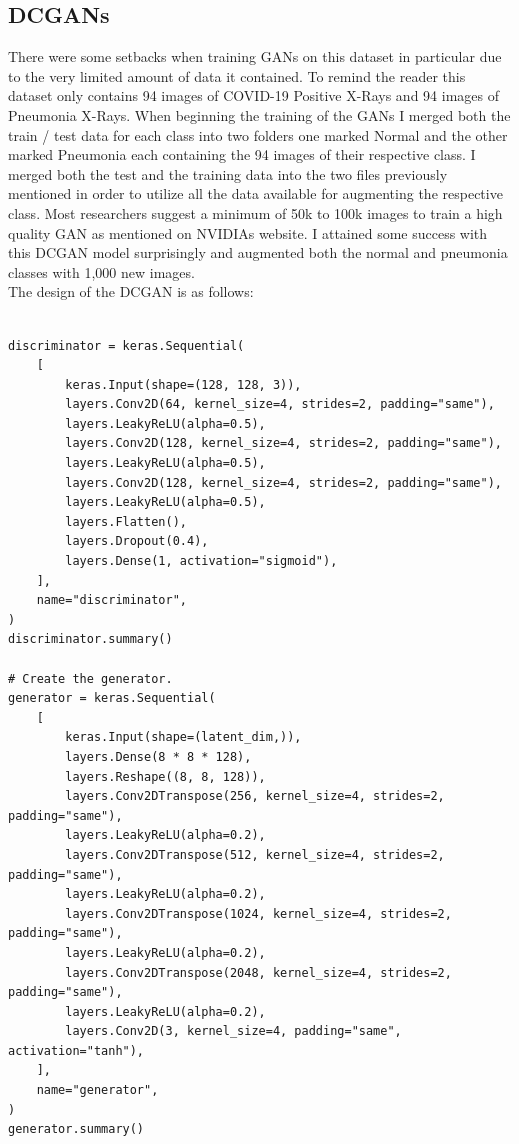 \subsection{DCGANs}
There were some setbacks when training GANs on this dataset in particular due to the very limited amount of data it contained.  To remind the reader this dataset only contains 94 images of COVID-19 Positive X-Rays and 94 images of Pneumonia X-Rays.  When beginning the training of the GANs I merged both the train / test data for each class into two folders one marked Normal and the other marked Pneumonia each containing the 94 images of their respective class.  I merged both the test and the training data into the two files previously mentioned in order to utilize all the data available for augmenting the respective class. Most researchers suggest a minimum of 50k to 100k images to train a high quality GAN as mentioned on NVIDIAs website\cite{nvidiaResearch}. I attained some success with this DCGAN model surprisingly and augmented both the normal and pneumonia classes with 1,000 new images.
\\
The design of the DCGAN is as follows:
\begin{verbatim}
    
discriminator = keras.Sequential(
    [
        keras.Input(shape=(128, 128, 3)),
        layers.Conv2D(64, kernel_size=4, strides=2, padding="same"),
        layers.LeakyReLU(alpha=0.5),
        layers.Conv2D(128, kernel_size=4, strides=2, padding="same"),
        layers.LeakyReLU(alpha=0.5),
        layers.Conv2D(128, kernel_size=4, strides=2, padding="same"),
        layers.LeakyReLU(alpha=0.5),
        layers.Flatten(),
        layers.Dropout(0.4),
        layers.Dense(1, activation="sigmoid"),
    ],
    name="discriminator",
)
discriminator.summary()

# Create the generator.
generator = keras.Sequential(
    [
        keras.Input(shape=(latent_dim,)),
        layers.Dense(8 * 8 * 128),
        layers.Reshape((8, 8, 128)),
        layers.Conv2DTranspose(256, kernel_size=4, strides=2, padding="same"),
        layers.LeakyReLU(alpha=0.2),
        layers.Conv2DTranspose(512, kernel_size=4, strides=2, padding="same"),
        layers.LeakyReLU(alpha=0.2),
        layers.Conv2DTranspose(1024, kernel_size=4, strides=2, padding="same"),
        layers.LeakyReLU(alpha=0.2),
        layers.Conv2DTranspose(2048, kernel_size=4, strides=2, padding="same"),
        layers.LeakyReLU(alpha=0.2),
        layers.Conv2D(3, kernel_size=4, padding="same", activation="tanh"),
    ],
    name="generator",
)
generator.summary()

\end{verbatim}
